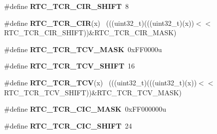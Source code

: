 \begin{DoxyCompactItemize}
\item 
\hypertarget{group___r_t_c___register___masks_ga4b8c9ecf8ed798b8c0173ce122874c5e}{}\#define {\bfseries R\+T\+C\+\_\+\+T\+C\+R\+\_\+\+C\+I\+R\+\_\+\+S\+H\+I\+F\+T}~8\label{group___r_t_c___register___masks_ga4b8c9ecf8ed798b8c0173ce122874c5e}

\item 
\hypertarget{group___r_t_c___register___masks_gaa25059e7519bf8e6316b66836be1cb18}{}\#define {\bfseries R\+T\+C\+\_\+\+T\+C\+R\+\_\+\+C\+I\+R}(x)                                                  ~(((uint32\+\_\+t)(((uint32\+\_\+t)(x))$<$$<$R\+T\+C\+\_\+\+T\+C\+R\+\_\+\+C\+I\+R\+\_\+\+S\+H\+I\+F\+T))\&R\+T\+C\+\_\+\+T\+C\+R\+\_\+\+C\+I\+R\+\_\+\+M\+A\+S\+K)\label{group___r_t_c___register___masks_gaa25059e7519bf8e6316b66836be1cb18}

\item 
\hypertarget{group___r_t_c___register___masks_ga920f92da02ac0a6ae0931645600e2405}{}\#define {\bfseries R\+T\+C\+\_\+\+T\+C\+R\+\_\+\+T\+C\+V\+\_\+\+M\+A\+S\+K}~0x\+F\+F0000u\label{group___r_t_c___register___masks_ga920f92da02ac0a6ae0931645600e2405}

\item 
\hypertarget{group___r_t_c___register___masks_ga6bcbafe57cdb430da5ee6902e0bcb224}{}\#define {\bfseries R\+T\+C\+\_\+\+T\+C\+R\+\_\+\+T\+C\+V\+\_\+\+S\+H\+I\+F\+T}~16\label{group___r_t_c___register___masks_ga6bcbafe57cdb430da5ee6902e0bcb224}

\item 
\hypertarget{group___r_t_c___register___masks_ga93b83f72083cd3683e8b75554763bc93}{}\#define {\bfseries R\+T\+C\+\_\+\+T\+C\+R\+\_\+\+T\+C\+V}(x)                                                  ~(((uint32\+\_\+t)(((uint32\+\_\+t)(x))$<$$<$R\+T\+C\+\_\+\+T\+C\+R\+\_\+\+T\+C\+V\+\_\+\+S\+H\+I\+F\+T))\&R\+T\+C\+\_\+\+T\+C\+R\+\_\+\+T\+C\+V\+\_\+\+M\+A\+S\+K)\label{group___r_t_c___register___masks_ga93b83f72083cd3683e8b75554763bc93}

\item 
\hypertarget{group___r_t_c___register___masks_ga788e49f72c48b3c98794b49e27337c64}{}\#define {\bfseries R\+T\+C\+\_\+\+T\+C\+R\+\_\+\+C\+I\+C\+\_\+\+M\+A\+S\+K}~0x\+F\+F000000u\label{group___r_t_c___register___masks_ga788e49f72c48b3c98794b49e27337c64}

\item 
\hypertarget{group___r_t_c___register___masks_ga84c801695fa1e344e7b2c8e6568cb7c8}{}\#define {\bfseries R\+T\+C\+\_\+\+T\+C\+R\+\_\+\+C\+I\+C\+\_\+\+S\+H\+I\+F\+T}~24\label{group___r_t_c___register___masks_ga84c801695fa1e344e7b2c8e6568cb7c8}


\end{DoxyCompactItemize}
